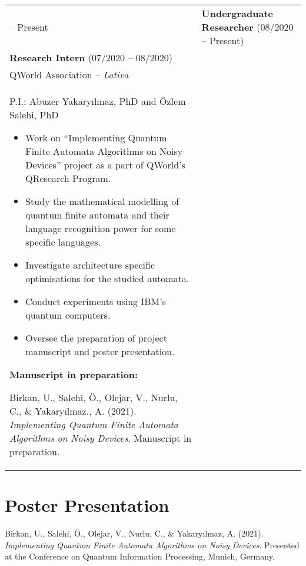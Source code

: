 \documentclass[11pt]{article} %
\makeatletter
\newlength{\firstColumnWidth}
\newlength{\tabusep}
\newenvironment{twocols}
    {
    \begin{longtable}[h]{%
        @{}%
        >{\raggedleft}p{\firstColumnWidth}%
        @{\hspace{\tabusep}}%
        >{\arraybackslash\raggedright}p{\dimexpr %
            \linewidth-\firstColumnWidth-\tabusep%
        \relax}%
        @{}%
        }
    } {
        \end{longtable}
    }
\makeatother
\begin{document}
\begin{twocols}
 2020 -- Present & 
        \textbf{Undergraduate Researcher} (08\kern1pt/2020 -- Present)\\
        \textbf{Research Intern} (07\kern1pt/2020 -- 08\kern1pt/2020)\\
        QWorld Association -- \textit{Lativa}\\
        P.I.: Abuzer Yakaryılmaz, PhD and Özlem Salehi, PhD
        \begin{itemize}
            \item Work on ``Implementing Quantum Finite Automata Algorithms on Noisy Devices'' project as a part of QWorld's QResearch Program.
            \item Study the mathematical modelling of quantum finite automata and their language recognition power for some specific languages.
            \item Investigate architecture specific optimisations for the studied automata.
            \item Conduct experiments using IBM's quantum computers.
            \item Oversee the preparation of project manuscript and poster presentation.
        \end{itemize}
        \textbf{Manuscript in preparation:}
        \begin{hangingpar}
           Birkan, U., Salehi, Ö., Olejar, V., Nurlu, C., \& Yakaryılmaz., A. (2021). \textit{Implementing Quantum Finite Automata Algorithms on Noisy Devices}. Manuscript in preparation.
        \end{hangingpar}
\end{twocols}

\section{Poster Presentation}

\begin{hangingpar}
Birkan, U., Salehi, Ö., Olejar, V., Nurlu, C., \& Yakaryılmaz, A. (2021). \textit{Implementing Quantum Finite Automata Algorithms on Noisy Devices}. Presented at the Conference on Quantum Information Processing, Munich, Germany.
\end{hangingpar}

\newpage
\end{document}
